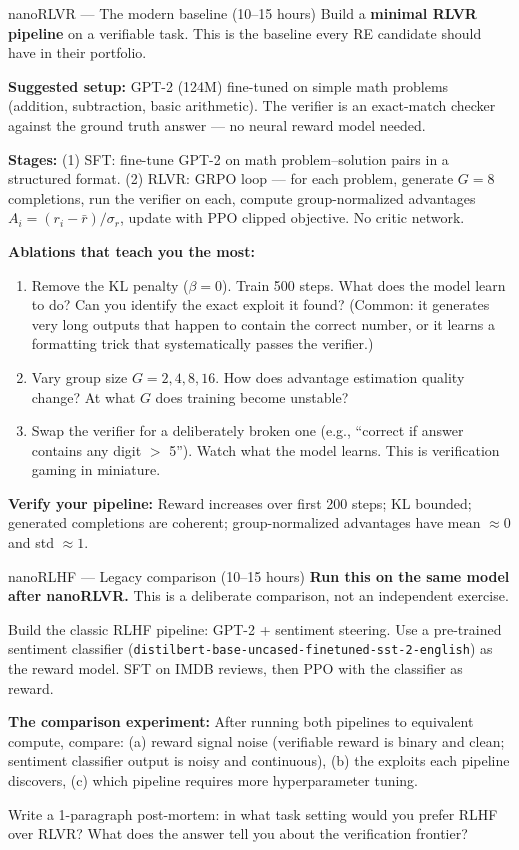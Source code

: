 \begin{exercise}{nanoRLVR --- The modern baseline (10--15 hours)}
Build a \textbf{minimal RLVR pipeline} on a verifiable task. This is the baseline every RE candidate should have in their portfolio.

\textbf{Suggested setup:} GPT-2 (124M) fine-tuned on simple math problems (addition, subtraction, basic arithmetic). The verifier is an exact-match checker against the ground truth answer --- no neural reward model needed.

\textbf{Stages:} (1) SFT: fine-tune GPT-2 on math problem--solution pairs in a structured format. (2) RLVR: GRPO loop --- for each problem, generate $G = 8$ completions, run the verifier on each, compute group-normalized advantages $A_i = (r_i - \bar{r})/\sigma_r$, update with PPO clipped objective. No critic network.

\textbf{Ablations that teach you the most:}
\begin{enumerate}[label=\alph*)]
  \item Remove the KL penalty ($\beta = 0$). Train 500 steps. What does the model learn to do? Can you identify the exact exploit it found? (Common: it generates very long outputs that happen to contain the correct number, or it learns a formatting trick that systematically passes the verifier.)
  \item Vary group size $G = 2, 4, 8, 16$. How does advantage estimation quality change? At what $G$ does training become unstable?
  \item Swap the verifier for a deliberately broken one (e.g., ``correct if answer contains any digit $>$ 5''). Watch what the model learns. This is verification gaming in miniature.
\end{enumerate}

\textbf{Verify your pipeline:} Reward increases over first 200 steps; KL bounded; generated completions are coherent; group-normalized advantages have mean $\approx 0$ and std $\approx 1$.
\end{exercise}

\begin{exercise}{nanoRLHF --- Legacy comparison (10--15 hours)}
\textbf{Run this on the same model after nanoRLVR.} This is a deliberate comparison, not an independent exercise.

Build the classic RLHF pipeline: GPT-2 + sentiment steering. Use a pre-trained sentiment classifier (\texttt{distilbert-base-uncased-finetuned-sst-2-english}) as the reward model. SFT on IMDB reviews, then PPO with the classifier as reward.

\textbf{The comparison experiment:} After running both pipelines to equivalent compute, compare: (a) reward signal noise (verifiable reward is binary and clean; sentiment classifier output is noisy and continuous), (b) the exploits each pipeline discovers, (c) which pipeline requires more hyperparameter tuning.

Write a 1-paragraph post-mortem: in what task setting would you prefer RLHF over RLVR? What does the answer tell you about the verification frontier?
\end{exercise}

